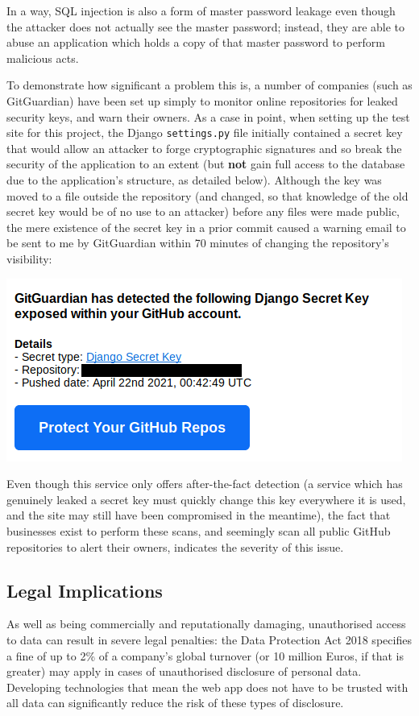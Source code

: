 \documentclass{report}
\begin{document}
In a way, SQL injection is also a form of master password leakage even though the attacker does not actually see the master password; instead, they are able to abuse an application which holds a copy of that master password to perform malicious acts.

To demonstrate how significant a problem this is, a number of companies (such as GitGuardian\cite{GitGuardian}) have been set up simply to monitor online repositories for leaked security keys, and warn their owners. As a case in point, when setting up the test site for this project, the Django \texttt{settings.py} file initially contained a secret key that would allow an attacker to forge cryptographic signatures and so break the security of the application to an extent (but \textbf{not} gain full access to the database due to the application's structure, as detailed below). Although the key was moved to a file outside the repository (and changed, so that knowledge of the old secret key would be of no use to an attacker) before any files were made public, the mere existence of the secret key in a prior commit caused a warning email to be sent to me by GitGuardian within 70 minutes of changing the repository's visibility:

\includegraphics[scale=0.5]{01-gitguardian.png}

Even though this service only offers after-the-fact detection (a service which has genuinely leaked a secret key must quickly change this key everywhere it is used, and the site may still have been compromised in the meantime), the fact that businesses exist to perform these scans, and seemingly scan all public GitHub repositories to alert their owners, indicates the severity of this issue.

\subsection{Legal Implications}
As well as being commercially and reputationally damaging, unauthorised access to data can result in severe legal penalties: the Data Protection Act 2018 specifies a fine of up to 2\% of a company's global turnover (or 10 million Euros, if that is greater) may apply in cases of unauthorised disclosure of personal data\cite{GDPR}. Developing technologies that mean the web app does not have to be trusted with all data can significantly reduce the risk of these types of disclosure.
\end{document}
